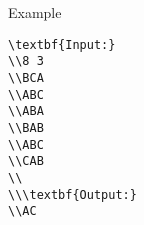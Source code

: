 Example
\begin{verbatim}
\textbf{Input:}
\\8 3
\\BCA
\\ABC
\\ABA
\\BAB
\\ABC
\\CAB
\\
\\\textbf{Output:}
\\AC\end{verbatim}